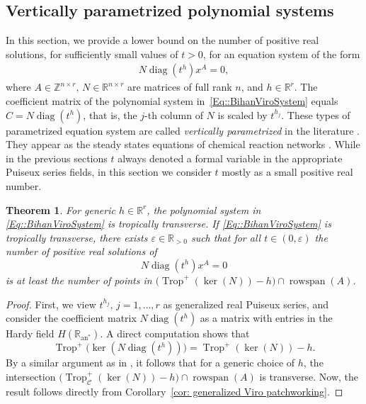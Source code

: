 \documentclass{article}
\newtheorem{theorem}{Theorem}[section]
\theoremstyle{definition}
\DeclareMathOperator{\Trop}{Trop}
\DeclareMathOperator{\rowspan}{rowspan}
\DeclareMathOperator{\diag}{diag}
\newcommand{\Z}{\mathbb{Z}}
\begin{document}
\subsection{Vertically parametrized polynomial systems}

In this section, we provide a lower bound on the number of positive real solutions, for sufficiently small values of $t > 0$, for an equation system of the form 
\begin{align}
\label{Eq::BihanViroSystem}
 N \diag(t^h) x^A = 0,
\end{align}
 where $A  \in \Z^{n \times r},\, N \in \mathbb{R}^{n \times r}$ are matrices of full rank $n$, and $h \in \mathbb{R}^r$. The coefficient matrix of the polynomial system in~\eqref{Eq::BihanViroSystem} equals $C = N \diag(t^h) $, that is, the $j$-th column of $N$ is scaled by $t^{h_j}$. These types of parametrized equation system are called \emph{vertically parametrized} in the literature \cite{RenHelminck,FeliuDim,HelminckHenrikssonRen}. They appear as the steady states equations of chemical reaction networks \cite{DickensteinInvitation,FeliuRoleofAlg}.
While in the previous sections $t$ always denoted a formal variable in the appropriate Puiseux series fields, in this section we consider $t$ mostly as a small positive real number.

\begin{theorem}
\label{Prop::LowerBoundVertic}
      For generic $h \in \mathbb{R}^r$, the polynomial system in \eqref{Eq::BihanViroSystem} is tropically transverse. If \eqref{Eq::BihanViroSystem} is tropically transverse, there exists $\varepsilon \in \mathbb{R}_{>0}$ such that for all $t \in (0,\varepsilon)$ the number of positive real solutions of 
  \[ N \diag(t^h) x^A = 0\]
  is at least the number of points in $\big(\Trop^+(\ker(N)) - h \big) \cap \rowspan(A)$.
\end{theorem}

\begin{proof}First, we view $t^{h_j}, \, j = 1, \dots, r$ as generalized real Puiseux series, and consider the coefficient matrix $N \diag(t^h)$ as a matrix with entries in the Hardy field $H(\mathbb{R}_{\text{an}^*})$. A direct computation shows that 
    \[\Trop^+\big(\ker(N\diag(t^h)) \big)  = \Trop^+(\ker(N)) - h.\]
    By a similar argument as in \cite[Proposition 3.6.12]{maclagan2015introduction}, it follows that for a generic choice of $h$, the intersection $\big(\Trop_\mathcal{C}^+(\ker(N)) - h \big) \cap \rowspan(A)$ is transverse. Now, the result follows directly from Corollary~\ref{cor: generalized Viro patchworking}.
\end{proof}
\end{document}
